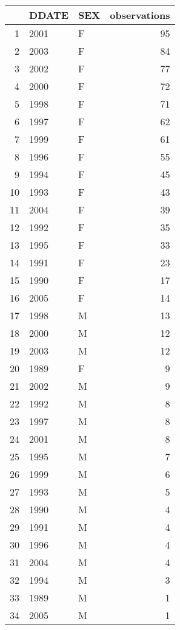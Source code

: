 \begin{table}[ht]
\centering
\begin{tabular}{rllr}
  \hline
 & DDATE & SEX & observations \\ 
  \hline
1 & 2001 & F &  95 \\ 
  2 & 2003 & F &  84 \\ 
  3 & 2002 & F &  77 \\ 
  4 & 2000 & F &  72 \\ 
  5 & 1998 & F &  71 \\ 
  6 & 1997 & F &  62 \\ 
  7 & 1999 & F &  61 \\ 
  8 & 1996 & F &  55 \\ 
  9 & 1994 & F &  45 \\ 
  10 & 1993 & F &  43 \\ 
  11 & 2004 & F &  39 \\ 
  12 & 1992 & F &  35 \\ 
  13 & 1995 & F &  33 \\ 
  14 & 1991 & F &  23 \\ 
  15 & 1990 & F &  17 \\ 
  16 & 2005 & F &  14 \\ 
  17 & 1998 & M &  13 \\ 
  18 & 2000 & M &  12 \\ 
  19 & 2003 & M &  12 \\ 
  20 & 1989 & F &   9 \\ 
  21 & 2002 & M &   9 \\ 
  22 & 1992 & M &   8 \\ 
  23 & 1997 & M &   8 \\ 
  24 & 2001 & M &   8 \\ 
  25 & 1995 & M &   7 \\ 
  26 & 1999 & M &   6 \\ 
  27 & 1993 & M &   5 \\ 
  28 & 1990 & M &   4 \\ 
  29 & 1991 & M &   4 \\ 
  30 & 1996 & M &   4 \\ 
  31 & 2004 & M &   4 \\ 
  32 & 1994 & M &   3 \\ 
  33 & 1989 & M &   1 \\ 
  34 & 2005 & M &   1 \\ 
   \hline
\end{tabular}
\end{table}
